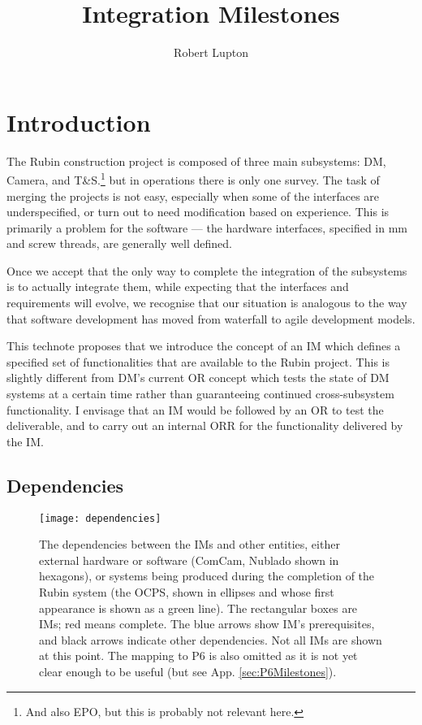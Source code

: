 \documentclass[SE,authoryear,toc]{lsstdoc}
\title{Integration Milestones}
\author{%
Robert Lupton
}
\date{\vcsDate}
\begin{document}
\maketitle

\section{Introduction}

The Rubin construction project is composed of three main subsystems: DM, Camera, and T\&S.\footnote{
  And also EPO, but this is probably not relevant here.}
but in operations there is only one survey.  The task of merging the projects is not easy, especially
when some of the interfaces are underspecified, or turn out to need modification based on experience.
This is primarily
a problem for the software --- the hardware interfaces, specified in mm and screw threads, are generally
well defined.

Once we accept that the only way to complete the integration of the subsystems is to actually integrate them,
while expecting that the interfaces and requirements will evolve, we recognise that our
situation is analogous to the
way that software development has moved from waterfall to agile development models.

This technote proposes that we introduce the concept of an \gls{IM} which defines
a specified set of functionalities that are available to the Rubin project.
This is slightly different from \gls{DM}'s
current \gls{OR} concept which tests the state of DM systems at a certain time rather than guaranteeing
continued cross-subsystem functionality.  I envisage that an \gls{IM} would be followed by an \gls{OR} to test
the deliverable, and to carry out an internal \gls{ORR} for the functionality delivered by the \gls{IM}.

\subsection{Dependencies}

\begin{figure}
\begin{center}
  \hspace*{-0.15\textwidth}\texttt{[image: dependencies]}
\end{center}
\caption{
  The dependencies between the IMs and other entities, either external hardware or software
  (\eg ComCam, Nublado shown in hexagons), or systems being produced during the completion
  of the Rubin system (\eg the \gls{OCPS}, shown in ellipses and whose first appearance
  is shown as a green line).
  The rectangular boxes are IMs; red means complete.  The blue arrows show IM's prerequisites,
  and black arrows indicate other dependencies.
  \hfil\break
  Not all IMs are shown at this point.  The mapping to P6 is also omitted as it is not
  yet clear enough to be useful (but see App. \ref{sec:P6Milestones}).
}
\label{fig:dependencies}
\end{figure}
\end{document}
